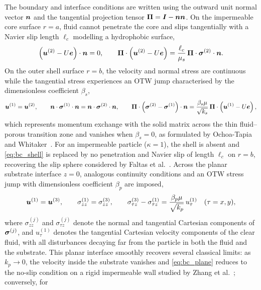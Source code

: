The boundary and interface conditions are written using the outward unit normal vector $\bm{n}$ and the tangential
projection tensor $\bm\Pi=\bm{I}-\bm{n}\bm{n}$. On the impermeable core surface $r=a$, fluid cannot penetrate the core and slips
tangentially with a Navier slip length $\ell_c$ modelling a hydrophobic surface,
\begin{equation}
  \left(\bm{u}^{(2)}-U\bm{e}\right)\cdot\bm{n}=0,\qquad
  \bm\Pi\cdot\left(\bm{u}^{(2)}-U\bm{e}\right)=\frac{\ell_c}{\mu_s}\,\bm\Pi\cdot\bm{\sigma}^{(2)}\cdot\bm{n} .
  \label{eq:bc_core}
\end{equation}
On the outer shell surface $r=b$, the velocity and normal stress are continuous while the tangential stress experiences
an OTW jump characterised by the dimensionless coefficient $\beta_s$,
\begin{equation}
  \bm{u}^{(1)}=\bm{u}^{(2)},\qquad \bm{n}\cdot\bm{\sigma}^{(1)}\cdot\bm{n}=\bm{n}\cdot\bm{\sigma}^{(2)}\cdot\bm{n},\qquad
  \bm\Pi\cdot\left(\bm{\sigma}^{(2)}-\bm{\sigma}^{(1)}\right)\cdot\bm{n}=\frac{\beta_s\mu}{\sqrt{k_s}}\,\bm\Pi\cdot\left(\bm{u}^{(1)}-U\bm{e}\right),
  \label{eq:bc_shell}
\end{equation}
which represents momentum exchange with the solid matrix across the thin fluid--porous transition zone and vanishes when
$\beta_s=0$, as formulated by Ochoa-Tapia and Whitaker~\cite{ochoatapia1995momentum}. For an impermeable particle
($\kappa=1$), the shell is absent and \cref{eq:bc_shell} is replaced by no penetration and Navier slip of length $\ell_c$
on $r=b$, recovering the slip sphere considered by Faltas et al.~\cite{faltas2021axisymmetric}. Across the planar
substrate interface $z=0$, analogous continuity conditions and an OTW stress jump with dimensionless coefficient
$\beta_p$ are imposed,
\begin{equation}
  \bm{u}^{(1)}=\bm{u}^{(3)},\qquad \sigma^{(1)}_{zz}=\sigma^{(3)}_{zz},\qquad
  \sigma^{(3)}_{\tau z}-\sigma^{(1)}_{\tau z}=\frac{\beta_p\mu}{\sqrt{k_p}}\,u^{(1)}_\tau\quad(\tau=x,y),
  \label{eq:bc_plane}
\end{equation}
where $\sigma^{(j)}_{zz}$ and $\sigma^{(j)}_{\tau z}$ denote the normal and tangential Cartesian components of
$\bm{\sigma}^{(j)}$, and $u^{(1)}_\tau$ denotes the tangential Cartesian velocity components of the clear fluid, with all
disturbances decaying far from the particle in both the fluid and the substrate. This planar interface smoothly recovers
several classical limits: as $k_p\to0$, the velocity inside the substrate vanishes and \cref{eq:bc_plane} reduces to the
no-slip condition on a rigid impermeable wall studied by Zhang et al.~\cite{zhang2023unsteady}; conversely, for

